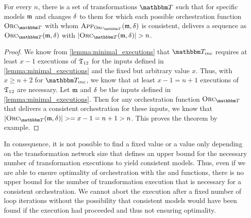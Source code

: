 \begin{theorem}
    \label{theorem:orchestration_fixed}
    For every $n$, there is a set of transformations $\transformationset{T}$ such that for specific models $\mathfrak{m}$ and changes $\mathfrak{\delta}_{}$ to them for which each possible orchestration function $\orcfunction{\transformationset{T}}$ with whom $\appfunction{\orcfunction{\transformationset{T}}}(\modeltuple{m}, \changetuple{})$ is consistent, delivers a sequence as $\orcfunction{\transformationset{T}}(\modeltuple{m}, \changetuple{})$ with $\abs{\orcfunction{\transformationset{T}}(\modeltuple{m}, \changetuple{})} > n$.
\end{theorem}
\begin{proof}
    We know from \autoref{lemma:minimal_executions} that $\transformationset{T}_{inc}$ requires at least $x-1$ executions of $\mathfrak{T}_{12}$ for the inputs defined in \autoref{lemma:minimal_executions} and the fixed but arbitrary value $x$.
    Thus, with $x \geq n+2$ for $\transformationset{T}_{inc}$, we know that at least $x-1 = n+1$ executions of $\mathfrak{T}_{12}$ are necessary.
    Let $\mathfrak{m}$ and $\mathfrak{\delta}_{}$ be the inputs defined in \autoref{lemma:minimal_executions}.
    Then for any orchestration function $\orcfunction{\transformationset{T}}$ that delivers a consistent orchestration for these inputs, we know that $\abs{\orcfunction{\transformationset{T}}(\modeltuple{m}, \changetuple{})} >= x-1 = n+1 > n$.
    This proves the theorem by example.
\end{proof}

In consequence, it is not possible to find a fixed value or a value only depending on the transformation network size that defines an upper bound for the necessary number of transformation executions to yield consistent models.
Thus, even if we are able to ensure optimality of orchestration with the  and  functions, there is no upper bound for the number of transformation execution that is necessary for a consistent orchestration.
We cannot abort the execution after a fixed number of loop iterations without the possibility that consistent models would have been found if the execution had proceeded and thus not ensuring optimality.


